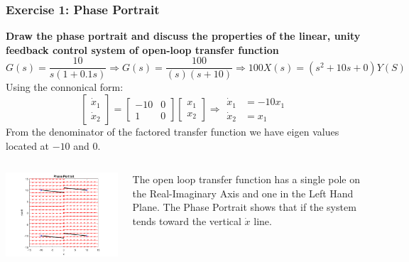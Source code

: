 \documentclass[11pt,handout]{beamer}   %
\begin{document}
\begin{frame}
\frametitle{Exercise 1: Phase Portrait}
\small 
\textbf{Draw the phase portrait and discuss the properties of the linear, unity feedback control system of open-loop transfer function}
\begin{equation*}
G(s) = \frac{10}{s(1+0.1s)} \Rightarrow G(s) = \frac{100}{(s)(s+10)} \Rightarrow 100X(s) = (s^2 + 10s + 0 ) Y(S)
\end{equation*}
Using the connonical form:
\begin{equation*}
\begin{bmatrix}
\dot{x}_1\\ \dot{x}_2
\end{bmatrix} = 
\begin{bmatrix}
-10 & 0\\ 1 & 0
\end{bmatrix} \begin{bmatrix}
x_1 \\ x_2
\end{bmatrix} \Rightarrow 
\begin{aligned}
\dot{x}_1 &= -10 x_1 \\ \dot{x}_2 &= x_1
\end{aligned}
\end{equation*}
From the denominator of the factored transfer function we have eigen values located at $-10$ and $0$.\\
\begin{columns}
\begin{column}{0.5\textwidth}
\centering
\includegraphics[width = \textwidth]{Figures/Exersize21.png}
\end{column}
\begin{column}{0.5\textwidth}
\small
The open loop transfer function has a single pole on the Real-Imaginary Axis and one in the Left Hand Plane. The Phase Portrait shows that if the system tends toward the vertical $\dot{x}$ line.
\end{column}
\end{columns}

\end{frame}
\end{document}
